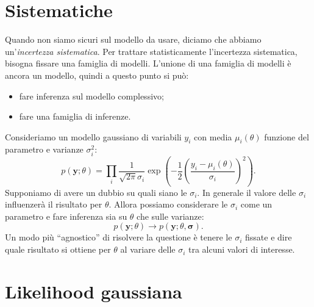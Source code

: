
\section{Sistematiche}

Quando non siamo sicuri sul modello da usare,
diciamo che abbiamo un'\emph{incertezza sistematica}.
Per trattare statisticamente l'incertezza sistematica,
bisogna fissare una famiglia di modelli.
L'unione di una famiglia di modelli è ancora un modello,
quindi a questo punto si può:
\begin{itemize}
	\item fare inferenza sul modello complessivo;
	\item fare una famiglia di inferenze.
\end{itemize}

\begin{example}
	Consideriamo un modello gaussiano di variabili $y_i$
	con media $\mu_i(\theta)$ funzione del parametro e varianze $\sigma_i^2$:
	\begin{equation*}
		p(\mathbf y;\theta)
		= \prod_i \frac1{\sqrt{2\pi}\sigma_i}
		\exp\left(-\frac12\left(\frac{y_i-\mu_i(\theta)}{\sigma_i}\right)^2\right).
	\end{equation*}
	Supponiamo di avere un dubbio su quali siano le $\sigma_i$.
	In generale il valore delle $\sigma_i$ influenzerà il risultato per $\theta$.
	Allora possiamo considerare le $\sigma_i$ come un parametro
	e fare inferenza sia su $\theta$ che sulle varianze:
	\begin{equation*}
		p(\mathbf y;\theta) \rightarrow p(\mathbf y;\theta,\boldsymbol\sigma).
	\end{equation*}
	Un modo più ``agnostico'' di risolvere la questione è tenere le $\sigma_i$ fissate
	e dire quale risultato si ottiene per $\theta$ al variare delle $\sigma_i$
	tra alcuni valori di interesse.
\end{example}

\section{Likelihood gaussiana}

